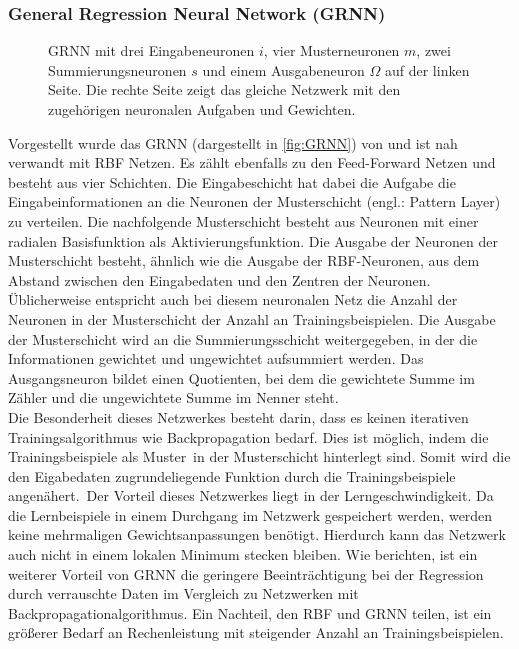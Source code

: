 \subsubsection{General Regression Neural Network (GRNN)}
\begin{figure}[!htb]
    \centering
        
    \caption[Darstellung eines GRNN]{GRNN mit drei Eingabeneuronen $i$, vier Musterneuronen $m$, zwei Summierungsneuronen $s$ und einem Ausgabeneuron $\Omega$  auf der linken Seite. Die rechte Seite zeigt das gleiche Netzwerk mit den zugehörigen neuronalen Aufgaben und Gewichten.}
    \label{fig:GRNN}
\end{figure}

Vorgestellt wurde das \gls{GRNN} (dargestellt in \autoref{fig:GRNN}) von \citet{Specht1991} und ist nah verwandt mit RBF Netzen. Es zählt ebenfalls zu den Feed-Forward Netzen und besteht aus vier Schichten. Die Eingabeschicht hat dabei die Aufgabe die Eingabeinformationen an die Neuronen der Musterschicht (engl.: Pattern Layer) zu verteilen. Die nachfolgende Musterschicht besteht aus Neuronen mit einer radialen Basisfunktion als Aktivierungsfunktion. Die Ausgabe der Neuronen der Musterschicht besteht, ähnlich wie die Ausgabe der RBF-Neuronen, aus dem Abstand zwischen den Eingabedaten und den Zentren der Neuronen. Üblicherweise entspricht auch bei diesem neuronalen Netz die Anzahl der Neuronen in der Musterschicht der Anzahl an Trainingsbeispielen. Die Ausgabe der Musterschicht wird an die Summierungsschicht weitergegeben, in der die Informationen gewichtet und ungewichtet aufsummiert werden. Das Ausgangsneuron bildet einen Quotienten, bei dem die gewichtete Summe im Zähler und die ungewichtete Summe im Nenner steht.\\
Die Besonderheit dieses Netzwerkes besteht darin, dass es keinen iterativen Trainingsalgorithmus wie Backpropagation bedarf. Dies ist möglich, indem die Trainingsbeispiele als \glqq Muster\grqq~in der Musterschicht hinterlegt sind. Somit wird die den Eigabedaten zugrundeliegende Funktion durch die Trainingsbeispiele angenähert.\, %
Der Vorteil dieses Netzwerkes liegt in der Lerngeschwindigkeit. Da die Lernbeispiele in einem Durchgang im Netzwerk gespeichert werden, werden keine mehrmaligen Gewichtsanpassungen benötigt. Hierdurch kann das Netzwerk auch nicht in einem lokalen Minimum stecken bleiben. Wie \citet{Marqueza1993} berichten, ist ein weiterer Vorteil von GRNN die geringere Beeinträchtigung bei der Regression durch verrauschte Daten im Vergleich zu Netzwerken mit Backpropagationalgorithmus.
Ein Nachteil, den RBF und GRNN teilen, ist ein größerer Bedarf an Rechenleistung mit steigender Anzahl an Trainingsbeispielen.  


